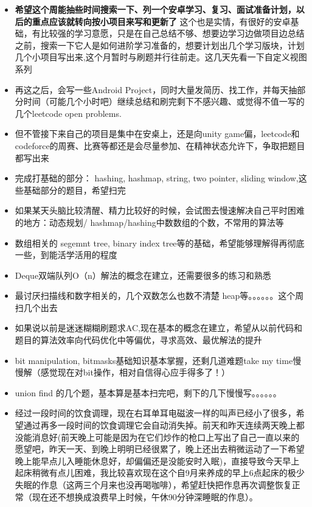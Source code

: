 \documentclass[9pt, b5paaper]{book}
\begin{document}
\begin{itemize}
\item \textbf{希望这个周能抽些时间搜索一下、列一个安卓学习、复习、面试准备计划，以后的重点应该就转向按小项目来写和更新了} 这个也是实情，有很好的安卓基础，有比较强的学习意愿，只是在自己总结不够、想要边学习边做项目边总结之前，搜索一下它人是如何进阶学习准备的，想要计划出几个学习版块，计划几个小项目写出来,这个月暂时与刷题并行往前走。这几天先看一下自定义视图系列

\item 再这之后，会写一些Android Project，同时大量发简历、找工作，并每天抽部分时间（可能几个小时吧）继续总结和刷完剩下不感兴趣、或觉得不值一写的几个leetcode open problems.

\item 但不管接下来自己的项目是集中在安桌上，还是向unity game偏，leetcode和codeforce的周赛、比赛等都还是会尽量参加、在精神状态允许下，争取把题目都写出来

\item 完成打基础的部分： hashing, hashmap, string, two pointer, sliding window,这些基础部分的题目，希望扫完
\item 如果某天头脑比较清醒、精力比较好的时候，会试图去慢速解决自己平时困难的地方：动态规划/ hashmap/hashing中数数组的个数，不常用的算法等

\item 数组相关的 segemnt tree, binary index tree等的基础，希望能够理解得再彻底一些，到能活学活用的程度
\item Deque双端队列O（n）解法的概念在建立，还需要很多的练习和熟悉
\item 最讨厌扫描线和数字相关的，几个双数怎么也数不清楚 heap等。。。。。。这个周扫几个出去

\item 如果说以前是迷迷糊糊刷题求AC,现在基本的概念在建立，希望从以前代码和题目的算法效率向代码优化中等偏优，寻求高效、最优解法的提升
\item bit manipulation, bitmasks基础知识基本掌握，还剩几道难题take my time慢慢解（感觉现在对bit操作，相对自信得心应手得多了！）
\item union find 的几个题，基本算是基本扫完吧，剩下的几下慢慢写。。。。。。

\item 经过一段时间的饮食调理，现在右耳单耳电磁波一样的叫声已经小了很多，希望通过再多一段时间的饮食调理它会自动消失掉。前天和昨天连续两天晚上都没能消息好(前天晚上可能是因为在它们炒作的枪口上写出了自己一直以来的愿望吧，昨天一天、到晚上明明已经很累了，晚上还出去稍微运动了一下希望晚上能早点儿入睡能休息好，却偏偏还是没能安时入眠)，直接导致今天早上起床稍微有点儿困难，我比较喜欢现在这个自9月来养成的早上6点起床的极少失眠的作息（这两三个月来也没再喝咖啡），希望赶快把作息再次调整恢复正常（现在还不想换成浪费早上时候，午休90分钟深睡眠的作息）。
\end{itemize}
\end{document}
